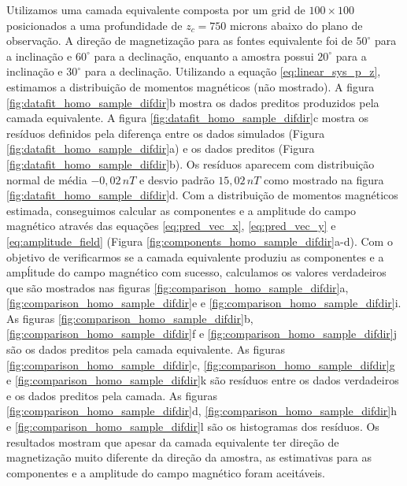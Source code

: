 Utilizamos uma camada equivalente composta por um grid de $100 \times 100$ posicionados a uma profundidade de $z_c = 750$ microns abaixo do plano de observação. A direção de magnetização para as fontes equivalente foi de $50^\circ$ para a inclinação e $60^\circ$ para a declinação, enquanto a amostra possui $20^\circ$ para a inclinação e $30^\circ$ para a declinação. Utilizando a equação \ref{eq:linear_sys_p_z}, estimamos a distribuição de momentos magnéticos (não mostrado). A figura \ref{fig:datafit_homo_sample_difdir}b mostra os dados preditos produzidos pela camada equivalente. A figura \ref{fig:datafit_homo_sample_difdir}c mostra os resíduos definidos pela diferença entre os dados simulados (Figura \ref{fig:datafit_homo_sample_difdir}a) e os dados preditos (Figura \ref{fig:datafit_homo_sample_difdir}b). Os resíduos aparecem com distribuição normal de média $-0,02 \, nT$ e desvio padrão $15,02 \, nT$ como mostrado na figura \ref{fig:datafit_homo_sample_difdir}d. Com a distribuição de momentos magnéticos estimada, conseguimos calcular as componentes e a amplitude do campo magnético através das equações \ref{eq:pred_vec_x}, \ref{eq:pred_vec_y} e \ref{eq:amplitude_field} (Figura \ref{fig:components_homo_sample_difdir}a-d). Com o objetivo de verificarmos se a camada equivalente produziu as componentes e a ampĺitude do campo magnético com sucesso, calculamos os valores verdadeiros que são mostrados nas  figuras \ref{fig:comparison_homo_sample_difdir}a, \ref{fig:comparison_homo_sample_difdir}e e \ref{fig:comparison_homo_sample_difdir}i. As figuras \ref{fig:comparison_homo_sample_difdir}b, \ref{fig:comparison_homo_sample_difdir}f e \ref{fig:comparison_homo_sample_difdir}j são os dados preditos pela camada equivalente. As figuras \ref{fig:comparison_homo_sample_difdir}c, \ref{fig:comparison_homo_sample_difdir}g e \ref{fig:comparison_homo_sample_difdir}k são resíduos entre os dados verdadeiros e os dados preditos pela camada. As figuras \ref{fig:comparison_homo_sample_difdir}d, \ref{fig:comparison_homo_sample_difdir}h e \ref{fig:comparison_homo_sample_difdir}l são os histogramas dos resíduos. Os resultados mostram que apesar da camada equivalente ter direção de magnetização muito diferente da direção da amostra, as estimativas para as componentes e a amplitude do campo magnético foram aceitáveis.  


